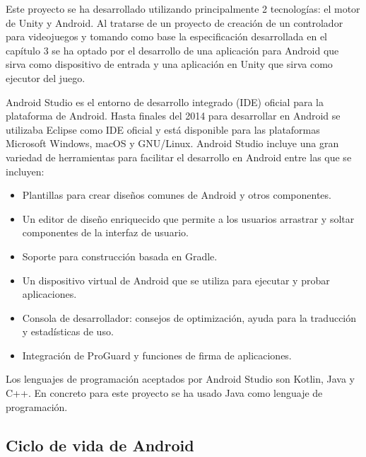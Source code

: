 Este proyecto se ha desarrollado utilizando principalmente 2 tecnolog\'ias: el motor de Unity y Android. Al tratarse de un proyecto de creaci\'on de un controlador para videojuegos y tomando como base la especificaci\'on desarrollada en el cap\'itulo 3 se ha optado por el desarrollo de una aplicaci\'on para Android que sirva como dispositivo de entrada y una aplicaci\'on en Unity que sirva como ejecutor del juego.

Android Studio es el entorno de desarrollo integrado (IDE) oficial para la plataforma de Android. Hasta finales del 2014 para desarrollar en Android se utilizaba Eclipse como IDE oficial y est\'a disponible para las plataformas Microsoft Windows, macOS y GNU/Linux. Android Studio incluye una gran variedad de herramientas para facilitar el desarrollo en Android entre las que se incluyen:

\begin {itemize}
\item Plantillas para crear dise\~nos comunes de Android y otros componentes.
\item Un editor de dise\~no enriquecido que permite a los usuarios arrastrar y soltar componentes de la interfaz de usuario.
\item Soporte para construcci\'on basada en Gradle.
\item Un dispositivo virtual de Android que se utiliza para ejecutar y probar aplicaciones.
\item Consola de desarrollador: consejos de optimizaci\'on, ayuda para la traducci\'on y estad\'isticas de uso.
\item Integraci\'on de ProGuard y funciones de firma de aplicaciones.
\end {itemize}
 
Los lenguajes de programaci\'on aceptados por Android Studio son Kotlin, Java y C++. En concreto para este proyecto se ha usado Java como lenguaje de programaci\'on.

\subsection {Ciclo de vida de Android}


